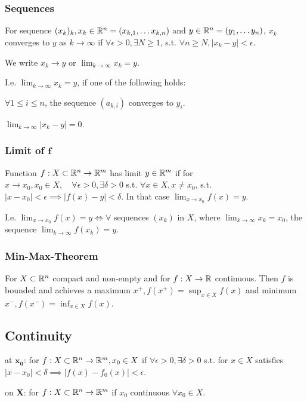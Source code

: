 \subsubsection{Sequences}
For sequence $(x_k)_k, x_k \in \mathbb{R}^n = (x_{k,1}, \dots x_{k,n})$ and $y \in \mathbb{R}^n = (y_1, \dots y_n)$, $x_k$ converges to $y$ as $k \to \infty$ if $\forall \epsilon > 0, \exists N \ge 1$, s.t. $\forall n \ge N, |x_k - y| < \epsilon$.

We write $x_k \to y$ or $\lim_{k \to \infty} x_k = y$.

I.e. $\lim_{k \to \infty} x_k = y$, if one of the following holds:
\begin{compactitem}
    \item $\forall 1 \le i \le n$, the sequence $(a_{k,i})$ converges to $y_i$.
    \item $\lim_{k \to \infty} |x_k - y| = 0$.
\end{compactitem}

\subsubsection{Limit of $\mathbf{f}$}
Function $f: X \subset \mathbb{R}^n \to \mathbb{R}^m$ has limit $y \in \mathbb{R}^m$ if for $x \to x_0, x_0 \in X, \quad \forall \epsilon > 0, \exists \delta > 0$ s.t. $\forall x \in X, x \neq x_0$, s.t. $|x - x_0| < \epsilon \implies |f(x) - y| < \delta$. In that case $\lim_{x \to x_0} f(x) = y$.

I.e. $\lim_{x\to x_0} f(x) = y \iff \forall$ sequences $(x_k)$ in $X$, where $\lim_{k \to \infty} x_k = x_0$, the sequence $\lim_{k \to \infty} f(x_k) = y$.

\subsubsection{Min-Max-Theorem}
For $X \subset \mathbb{R}^n$ compact and non-empty and for $f: X \to \mathbb{R}$ continuous. Then $f$ is bounded and achieves a maximum $x^+, f(x^+) = \sup_{x \in X} f(x)$ and minimum $x^-, f(x^-) = \inf_{x \in X} f(x)$.

\subsection{Continuity}
\begin{compactdesc}
    \item[at $\mathbf{x_0}$:] for $f: X \subset \mathbb{R}^n \to \mathbb{R}^m, x_0 \in X$ if $\forall \epsilon > 0, \exists \delta > 0$ s.t. for $x \in X$ satisfies $| x - x_0 | < \delta \implies | f(x) - f_0(x) | < \epsilon$.
    \item[on $\textbf{X}$:] for $f: X \subset \mathbb{R}^n \to \mathbb{R}^m$ if $x_0$ continuous $\forall x_0 \in X$.
\end{compactdesc}

